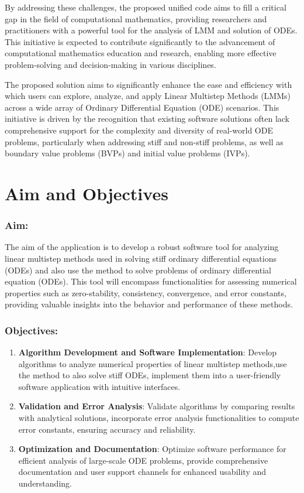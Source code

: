 By addressing these challenges, the proposed unified code aims to fill a critical gap in the field of computational mathematics, providing researchers and practitioners with a powerful tool for the analysis of LMM and solution of ODEs. This initiative is expected to contribute significantly to the advancement of computational mathematics education and research, enabling more effective problem-solving and decision-making in various disciplines.

The proposed solution aims to significantly enhance the ease and efficiency with which users can explore, analyze, and apply Linear Multistep Methods (LMMs) across a wide array of Ordinary Differential Equation (ODE) scenarios. This initiative is driven by the recognition that existing software solutions often lack comprehensive support for the complexity and diversity of real-world ODE problems, particularly when addressing stiff and non-stiff problems, as well as boundary value problems (BVPs) and initial value problems (IVPs).


\section{Aim and Objectives}
\subsubsection{Aim:}
The aim of the application is to develop a robust software tool for analyzing linear multistep methods used in solving stiff ordinary differential equations (ODEs) and also use the method to solve problems of ordinary differential equation (ODEs).
This tool will encompass functionalities for assessing numerical properties such as zero-stability, consistency, convergence, and error constants, providing valuable insights into the behavior and performance of these methods.
\subsubsection{Objectives:}
\begin{enumerate}
  \item \textbf{Algorithm Development and Software Implementation}: Develop algorithms to analyze numerical properties of linear multistep methods,use the method to also solve stiff ODEs, implement them into a user-friendly software application with intuitive interfaces.

  \item \textbf{Validation and Error Analysis}: Validate algorithms by comparing results with analytical solutions, incorporate error analysis functionalities to compute error constants, ensuring accuracy and reliability.

  \item \textbf{Optimization and Documentation}: Optimize software performance for efficient analysis of large-scale ODE problems, provide comprehensive documentation and user support channels for enhanced usability and understanding.

\end{enumerate}

